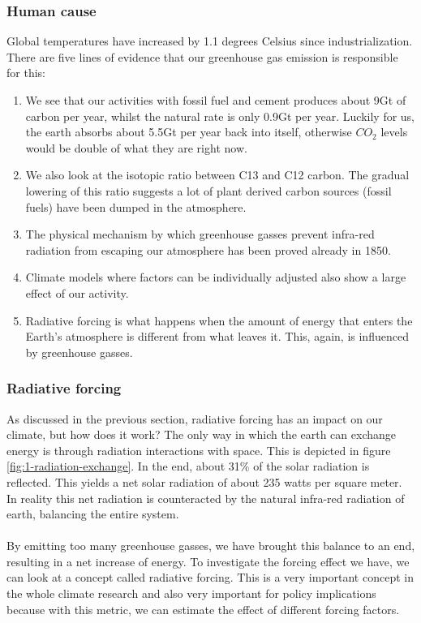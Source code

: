 \documentclass[../summary.tex]{subfiles}
\begin{document}
			\newpage
			\subsubsection{Human cause}
				Global temperatures have increased by 1.1 degrees Celsius since industrialization. There are five lines of evidence that our greenhouse gas emission is responsible for this:
				\begin{enumerate}
					\item We see that our activities with fossil fuel and cement produces about 9Gt of carbon per year, whilst the natural rate is only 0.9Gt per year. Luckily for us, the earth absorbs about 5.5Gt per year back into itself, otherwise $CO_2$ levels would be double of what they are right now. 
					\item We also look at the isotopic ratio between C13 and C12 carbon. The gradual lowering of this ratio suggests a lot of plant derived carbon sources (fossil fuels) have been dumped in the atmosphere. 
					\item The physical mechanism by which greenhouse gasses prevent infra-red radiation from escaping our atmosphere has been proved already in 1850.
					\item Climate models where factors can be individually adjusted also show a large effect of our activity.
					\item Radiative forcing is what happens when the amount of energy that enters the Earth's atmosphere is different from what leaves it. This, again, is influenced by greenhouse gasses.
				\end{enumerate}
			
			\subsubsection{Radiative forcing}
				As discussed in the previous section, radiative forcing has an impact on our climate, but how does it work? The only way in which the earth can exchange energy is through radiation interactions with space. This is depicted in figure \ref{fig:1-radiation-exchange}.  In the end, about 31\% of the solar radiation is reflected. This yields a net solar radiation of about 235 watts per square meter. In reality this net radiation is counteracted by the natural infra-red radiation of earth, balancing the entire system. \\
				\\
				By emitting too many greenhouse gasses, we have brought this balance to an end, resulting in a net increase of energy. To investigate the forcing effect we have, we can look at a concept called radiative forcing. This is a very important concept in the whole climate research and also very important for policy implications because with this metric, we can estimate the effect of different forcing factors.\\
				
\end{document}

